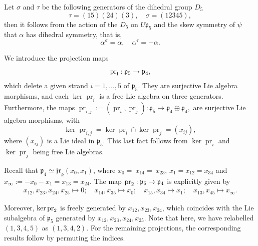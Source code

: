 \documentclass[a4paper,fleqn]{cas-sc}
\DeclareMathOperator{\pr}{pr}
\begin{document}
Let $\sigma$ and $\tau$ be the following generators of the dihedral group $D_5$
\begin{equation}\label{eq:dihedral_generator}
	\tau=(15)(24)(3),\quad \sigma=(12345),
\end{equation}
then it follows from the action of the $D_5$ on $U\mathfrak{p}_5$ and the skew symmetry of $\psi$ that $\alpha$ has dihedral symmetry, that is,
\begin{equation}\label{eq:dihedral_symmetry}
	\alpha^{\sigma}=\alpha,\quad \alpha^{\tau}=-\alpha.
\end{equation}


We introduce the projection maps 
\begin{equation}
\label{eq:strand-projection}
\rm{pr}_i:\mathfrak{p}_5 \to \mathfrak{p}_4,
\end{equation}
which delete a given strand $i=1,\ldots,5$ of $\mathfrak{p}_5$.
They are surjective Lie algebra morphisms, and each $\ker \pr_{i}$ is a free Lie algebra on three generators. Furthermore, the maps %
$
\pr_{i,j} :=(\pr_i,\pr_j) : \mathfrak{p}_5 \mapsto \mathfrak{p}_4\oplus \mathfrak{p}_4,
$
are surjective Lie algebra morphisms, with 
    \begin{equation}
    \label{eq:kerprij}
        \ker \pr_{i,j} =\ker \pr_{i}\cap \ker \pr_j=(x_{ij}),
    \end{equation}
where $(x_{ij})$ is a Lie ideal in $\mathfrak{p}_5$. This last fact follows from $\ker \pr_i$ and $\ker \pr_j$ being free Lie algebras.

\begin{ex}
Recall that $\mathfrak{p}_4\simeq \mathfrak{fr}_k(x_0,x_1)$, where $x_0=~x_{14}=~x_{23}$, $x_{1}=x_{12}=x_{34}$ and $x_{\infty}:=-x_0-x_1=x_{13}=x_{24}$. The map $\rm{pr}_2 : \mathfrak{p}_5\to \mathfrak{p}_4$ is explicitly given by
\begin{align*}
    x_{12}, x_{23}, x_{24}, x_{25} \mapsto 0; \quad 
    x_{14}, x_{35} \mapsto x_0; \quad 
    x_{15}, x_{34} \mapsto x_1; \quad
    x_{13}, x_{45} \mapsto x_\infty.
\end{align*}

Moreover, $\ker \rm{pr}_2$ is freely generated by $x_{12},x_{23},x_{24}$, which coincides with the Lie subalgebra of $\mathfrak{p}_5$ generated by $x_{12},x_{23},x_{24},x_{25}$. Note that here, we have relabelled $(1,3,4,5)$ as $(1,3,4,2)$. For the remaining projections, the corresponding results follow by permuting the indices.
\end{ex}
\end{document}
